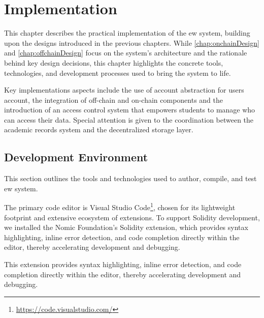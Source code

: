 \chapter{Implementation}
\label{chap:implementation}
This chapter describes the practical implementation of the \acrlong{ew} system, building upon the designs introduced in the previous chapters. While \cref{chap:onchainDesign} and \cref{chap:offchainDesign} focus on the system's architecture and the rationale behind key design decisions, this chapter highlights the concrete tools, technologies, and development processes used to bring the system to life.

Key implementations aspects include the use of account abstraction for users account, the integration of off-chain and on-chain components and the introduction of an access control system that empowers students to manage who can access their data. Special attention is given to the coordination between the academic records system and the decentralized storage layer. 

\section{Development Environment}
\label{sec:developmentEnvironment}
This section outlines the tools and technologies used to author, compile, and test \acrlong{ew} system.

The primary code editor is Visual Studio Code\footnote{\url{https://code.visualstudio.com/}}, chosen for its lightweight footprint and extensive ecosystem of extensions. To support Solidity development, we installed the Nomic Foundation's Solidity extension, which provides syntax highlighting, inline error detection, and code completion directly within the editor, thereby accelerating development and debugging.

This extension provides syntax highlighting, inline error detection, and code completion directly within the editor, thereby accelerating development and debugging.


